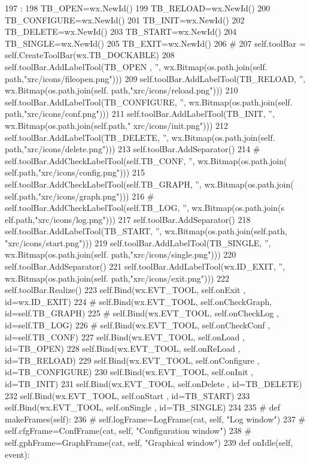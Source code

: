\begin{DoxyCode}
197                          :
198         TB_OPEN=wx.NewId()
199         TB_RELOAD=wx.NewId()
200         TB_CONFIGURE=wx.NewId()
201         TB_INIT=wx.NewId()
202         TB_DELETE=wx.NewId()
203         TB_START=wx.NewId()
204         TB_SINGLE=wx.NewId()
205         TB_EXIT=wx.NewId()
206         #
207         self.toolBar = self.CreateToolBar(wx.TB_DOCKABLE)
208         self.toolBar.AddLabelTool(TB_OPEN  , '', wx.Bitmap(os.path.join(self.
      path,"xrc/icons/fileopen.png")))
209         self.toolBar.AddLabelTool(TB_RELOAD, '', wx.Bitmap(os.path.join(self.
      path,"xrc/icons/reload.png")))
210         self.toolBar.AddLabelTool(TB_CONFIGURE, '', wx.Bitmap(os.path.join(self.
      path,"xrc/icons/conf.png")))
211         self.toolBar.AddLabelTool(TB_INIT, '', wx.Bitmap(os.path.join(self.path,"
      xrc/icons/init.png")))
212         self.toolBar.AddLabelTool(TB_DELETE, '', wx.Bitmap(os.path.join(self.
      path,"xrc/icons/delete.png")))
213         self.toolBar.AddSeparator()
214 #        self.toolBar.AddCheckLabelTool(self.TB_CONF, '', wx.Bitmap(os.path.join(
      self.path,"xrc/icons/config.png")))
215         self.toolBar.AddCheckLabelTool(self.TB_GRAPH, '', wx.Bitmap(os.path.join(
      self.path,"xrc/icons/graph.png")))
216 #        self.toolBar.AddCheckLabelTool(self.TB_LOG, '', wx.Bitmap(os.path.join(s
      elf.path,"xrc/icons/log.png")))
217         self.toolBar.AddSeparator()
218         self.toolBar.AddLabelTool(TB_START, '', wx.Bitmap(os.path.join(self.path,
      "xrc/icons/start.png")))
219         self.toolBar.AddLabelTool(TB_SINGLE, '', wx.Bitmap(os.path.join(self.
      path,"xrc/icons/single.png")))
220         self.toolBar.AddSeparator()
221         self.toolBar.AddLabelTool(wx.ID_EXIT, '', wx.Bitmap(os.path.join(self.
      path,"xrc/icons/exit.png")))
222         self.toolBar.Realize()
223         self.Bind(wx.EVT_TOOL, self.onExit      , id=wx.ID_EXIT)
224 #        self.Bind(wx.EVT_TOOL, self.onCheckGraph, id=self.TB_GRAPH)
225 #        self.Bind(wx.EVT_TOOL, self.onCheckLog  , id=self.TB_LOG)
226 #        self.Bind(wx.EVT_TOOL, self.onCheckConf , id=self.TB_CONF)
227         self.Bind(wx.EVT_TOOL, self.onLoad , id=TB_OPEN)
228         self.Bind(wx.EVT_TOOL, self.onReLoad , id=TB_RELOAD)
229         self.Bind(wx.EVT_TOOL, self.onConfigure , id=TB_CONFIGURE)
230         self.Bind(wx.EVT_TOOL, self.onInit , id=TB_INIT)
231         self.Bind(wx.EVT_TOOL, self.onDelete , id=TB_DELETE)
232         self.Bind(wx.EVT_TOOL, self.onStart , id=TB_START)
233         self.Bind(wx.EVT_TOOL, self.onSingle , id=TB_SINGLE)
234 
235 #    def makeFrames(self):
236 #        self.logFrame=LogFrame(cat, self, "Log window")
237 #        self.cfgFrame=ConfFrame(cat, self, "Configuration window")
238 #        self.gphFrame=GraphFrame(cat, self, "Graphical window")
239         
    def onIdle(self, event):
\end{DoxyCode}
